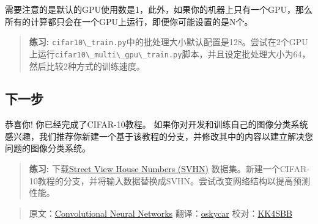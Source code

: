 需要注意的是默认的GPU使用数是1，此外，如果你的机器上只有一个GPU，那么所有的计算都只会在一个GPU上运行，即便你可能设置的是N个。

\begin{quote}
\textbf{练习:}
\lstinline{cifar10\_train.py}中的批处理大小默认配置是128。尝试在2个GPU上运行\lstinline{cifar10\_multi\_gpu\_train.py}脚本，并且设定批处理大小为64，然后比较2种方式的训练速度。
\end{quote}

\subsection{下一步 }\label{ux4e0bux4e00ux6b65}

恭喜你! 你已经完成了CIFAR-10教程。 如果你对开发和训练自己的图像分类系统感兴趣，我们推荐你新建一个基于该教程的分支，并修改其中的内容以建立解决您问题的图像分类系统。

\begin{quote}
\textbf{练习:} 下载\href{http://ufldl.stanford.edu/housenumbers/}{Street
View House Numbers (SVHN)}
数据集。新建一个CIFAR-10教程的分支，并将输入数据替换成SVHN。尝试改变网络结构以提高预测性能。
\end{quote}

\begin{quote}
原文：\href{http://tensorflow.org/tutorials/deep_cnn/index.md}{Convolutional
Neural Networks} 翻译：\href{https://github.com/oskycar}{oskycar}
校对：\href{https://github.com/zhyhooo}{KK4SBB}
\end{quote}
